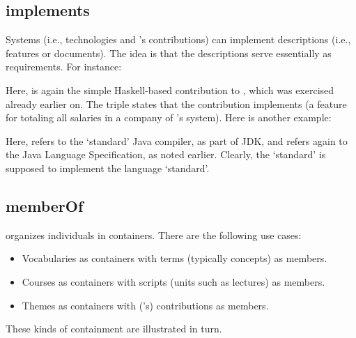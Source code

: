 
\subsection{implements}
\label{S:implements}

Systems (i.e., technologies and \ooo{}'s contributions) can implement
descriptions (i.e., features or documents). The idea is that the
descriptions serve essentially as requirements. For instance:


\noindent
Here,  is again the simple Haskell-based
contribution to \ooo{}, which was exercised already earlier on. The
triple states that the contribution implements  (a
feature for totaling all salaries in a company of \ooo{}'s
system). Here is another example:


\noindent
Here,  refers to the `standard' Java compiler, as part
of JDK, and  refers again to the Java Language
Specification, as noted earlier. Clearly, the `standard' is supposed
to implement the language `standard'.


\subsection{memberOf}
\label{S:memberOf}

\solasote{} organizes individuals in containers. There are the
following use cases: 
%
\begin{itemize}
\item Vocabularies as containers with terms (typically concepts) as
  members.
\item Courses as containers with scripts (units such as lectures) as
  members.
\item Themes as containers with (\ooo{}'s) contributions as members.
\end{itemize}
%
These kinds of containment are illustrated in turn.





